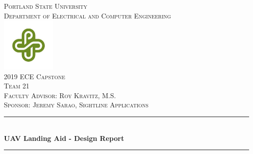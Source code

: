 \documentclass[11pt]{article}
\begin{document}

\begin{titlepage} %
	\newcommand{\HRule}{\rule{\linewidth}{0.5mm}} %
	
	\center %
	
	
	\textsc{\LARGE Portland State University
}\\[.25cm] %
	
	\textsc{\Large Department of Electrical and Computer Engineering }\\[1cm] %
\includegraphics[width=0.2\textwidth]{psuLOGO.jpg}\\[1cm]	
	\textsc{\LARGE2019  ECE Capstone }\\[0.12cm] %
	\textsc{\LARGE Team 21 }\\[0.12cm]	
		\textsc{\Large Faculty Advisor: Roy Kravitz, M.S. }\\[0.12cm]
		\textsc{\Large Sponsor: Jeremy Sarao, Sightline Applications }\\[1cm]
	
	
	\HRule\\[0.4cm]
	
	{\huge\bfseries UAV Landing Aid - Design Report}\\[0.4cm] %
	
	\HRule\\[1.5cm]
	
	


\end{titlepage}
\end{document}
